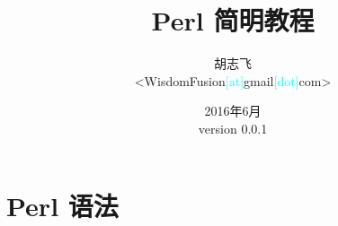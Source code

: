 \documentclass[12pt,a4paper]{ctexart}
\begin{document}
\title{\textbf{Perl 简明教程}}
\author{胡志飞\\<WisdomFusion\textcolor{cyan}{\small [at]}gmail\textcolor{cyan}{\small [dot]}com>}
\date{\color{OrangeRed}2016年6月\\version 0.0.1}

\maketitle{}
\thispagestyle{empty}
\clearpage{}

\tableofcontents

\clearpage{}

\setcounter{page}{1}

\section{Perl 语法}
\label{sec:perl-syntax}
\end{document}

